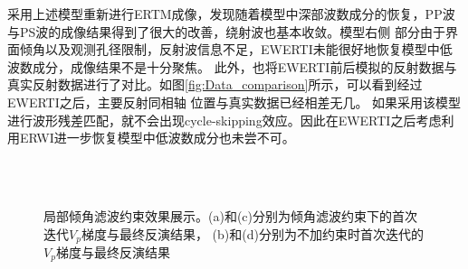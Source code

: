 采用上述模型重新进行ERTM成像，发现随着模型中深部波数成分的恢复，PP波与PS波的成像结果得到了很大的改善，绕射波也基本收敛。模型右侧
部分由于界面倾角以及观测孔径限制，反射波信息不足，EWERTI未能很好地恢复模型中低波数成分，成像结果不是十分聚焦。
此外，也将EWERTI前后模拟的反射数据与真实反射数据进行了对比。如图\ref{fig:Data_comparison}所示，可以看到经过EWERTI之后，主要反射同相轴
位置与真实数据已经相差无几。
如果采用该模型进行波形残差匹配，就不会出现cycle-skipping效应。因此在EWERTI之后考虑利用ERWI进一步恢复模型中低波数成分也未尝不可。
\begin{figure}[!htb]
   \centering
   \\
   \\
   \caption{局部倾角滤波约束效果展示。(a)和(c)分别为倾角滤波约束下的首次迭代$V_p$梯度与最终反演结果，
   (b)和(d)分别为不加约束时首次迭代的$V_p$梯度与最终反演结果}
   \label{fig:LSF_comparison}
\end{figure}


